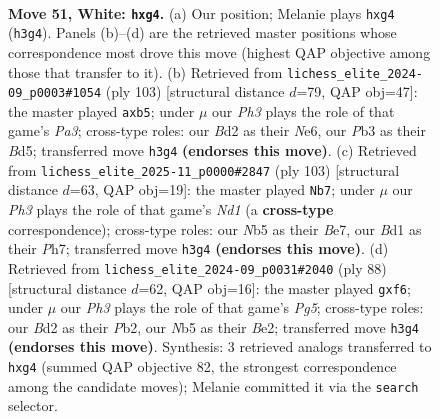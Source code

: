 \documentclass[11pt]{article}
\begin{document}
\clearpage

\begin{figure}[p]\centering
\begin{subfigure}{0.46\textwidth}\centering
\resizebox{\linewidth}{!}{%
\newchessgame
\chessboard[
  setfen={nnb5/1p4k1/1b6/pN1p4/6pp/PP2P2P/3BP1K1/3B4 w - - 0 51},
  showmover=false,
  pgfstyle=straightmove, color=movearrow, markmove={h3-g4}
]}
\caption{}
\end{subfigure}\hfill
\begin{subfigure}{0.46\textwidth}\centering
\resizebox{\linewidth}{!}{%
\newchessgame
\chessboard[
  setfen={8/1p6/p2Bn1k1/1PPb1pp1/P7/4P1K1/8/3B4 b - - 0 52},
  showmover=false,
  pgfstyle=straightmove, color=movearrow, markmove={a6-b5}
]}
\caption{}
\end{subfigure}
\\[4pt]
\begin{subfigure}{0.46\textwidth}\centering
\resizebox{\linewidth}{!}{%
\newchessgame
\chessboard[
  setfen={3n4/4b2p/2k1Pnp1/p2p4/1p1P4/1P2N1BB/P3K2P/8 b - - 18 52},
  showmover=false,
  pgfstyle=straightmove, color=movearrow, markmove={d8-b7}
]}
\caption{}
\end{subfigure}\hfill
\begin{subfigure}{0.46\textwidth}\centering
\resizebox{\linewidth}{!}{%
\newchessgame
\chessboard[
  setfen={6k1/3b1p2/5bp1/1p2p1P1/2p1P3/1nP1BP2/1P2B1K1/8 w - - 0 45},
  showmover=false,
  pgfstyle=straightmove, color=movearrow, markmove={g5-f6}
]}
\caption{}
\end{subfigure}
\caption{\textbf{Move 51, White: \texttt{hxg4}.} (a) Our position; Melanie plays \texttt{hxg4} (\texttt{h3g4}). Panels (b)--(d) are the retrieved master positions whose correspondence most drove this move (highest QAP objective among those that transfer to it). (b) Retrieved from \texttt{lichess\_elite\_2024-09\_p0003\#1054} (ply 103) [structural distance $d$=79, QAP obj=47]: the master played \texttt{axb5}; under $\mu$ our \emph{Ph3} plays the role of that game's \emph{Pa3}; cross-type roles: our \emph{B}d2 as their \emph{N}e6, our \emph{P}b3 as their \emph{B}d5; transferred move \texttt{h3g4} \textbf{(endorses this move)}. (c) Retrieved from \texttt{lichess\_elite\_2025-11\_p0000\#2847} (ply 103) [structural distance $d$=63, QAP obj=19]: the master played \texttt{Nb7}; under $\mu$ our \emph{Ph3} plays the role of that game's \emph{Nd1} (a \textbf{cross-type} correspondence); cross-type roles: our \emph{N}b5 as their \emph{B}e7, our \emph{B}d1 as their \emph{P}h7; transferred move \texttt{h3g4} \textbf{(endorses this move)}. (d) Retrieved from \texttt{lichess\_elite\_2024-09\_p0031\#2040} (ply 88) [structural distance $d$=62, QAP obj=16]: the master played \texttt{gxf6}; under $\mu$ our \emph{Ph3} plays the role of that game's \emph{Pg5}; cross-type roles: our \emph{B}d2 as their \emph{P}b2, our \emph{N}b5 as their \emph{B}e2; transferred move \texttt{h3g4} \textbf{(endorses this move)}. Synthesis: 3 retrieved analogs transferred to \texttt{hxg4} (summed QAP objective 82, the strongest correspondence among the candidate moves); Melanie committed it via the \texttt{search} selector.}
\label{fig:thought-m100}
\end{figure}
\end{document}
